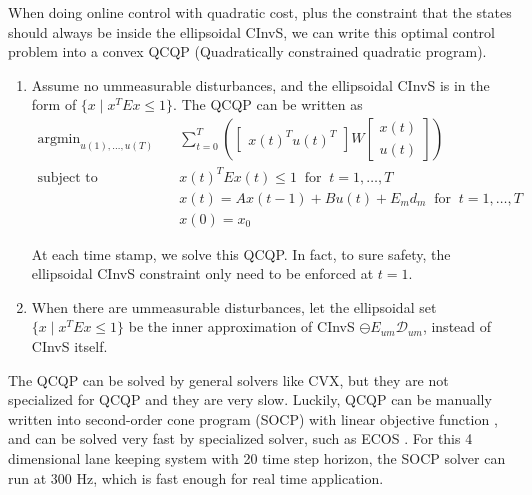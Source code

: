 \documentclass{article}
\begin{document}
When doing online control with quadratic cost, plus the constraint that the states should always be inside the ellipsoidal CInvS, we can write this optimal control problem into a convex QCQP (Quadratically constrained quadratic program). 
\begin{enumerate}
\item Assume no ummeasurable disturbances, and the ellipsoidal CInvS is in the form of $\{x\;| \; x^T E x \leq 1\}$. The QCQP can be written as
\begin{align*}
\text{argmin}_{u(1), \dots, u(T)}  \quad & \sum_{t=0}^T \left(\begin{bmatrix}x(t)^T u(t)^T \end{bmatrix} W \begin{bmatrix}x(t) \\u(t) \end{bmatrix}\right)\\
\text{subject to} \quad & x(t)^T E x(t) \leq 1 \;\;\text{for}\;\; t = 1, \dots, T\\
& x(t) = Ax(t-1) + Bu(t) + E_m d_m\;\;\text{for}\;\; t = 1, \dots, T\\
& x(0) = x_0
\end{align*}

At each time stamp, we solve this QCQP. In fact, to sure safety, the ellipsoidal CInvS constraint only need to be enforced at $t=1$.

\item When there are ummeasurable disturbances, let the ellipsoidal set $\{x\;| \; x^T E x \leq 1\}$ be the inner approximation of CInvS $\ominus E_{um} \mathcal D_{um} $, instead of CInvS itself.
\end{enumerate}

The QCQP can be solved by general solvers like CVX, but they are not specialized for QCQP and they are very slow. Luckily, QCQP can be manually written into second-order cone program (SOCP) with linear objective function \cite{convexopti}, and can be solved very fast by specialized solver, such as ECOS \cite{ecos}. For this 4 dimensional lane keeping system with 20 time step horizon, the SOCP solver can run at 300 Hz, which is fast enough for real time application.
\end{document}

